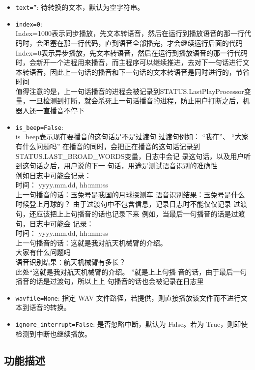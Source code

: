 \documentclass[]{article}
\begin{document}
	\begin{itemize}
		\item \texttt{text=''}: 待转换的文本，默认为空字符串。
		\item \texttt{index=0}:\\
		Index=1000表示同步播放，先文本转语音，然后在运行到播放语音的那一行代码时，会阻塞在那一行代码，直到语音全部播完，才会继续运行后面的代码\\
		Index=0表示异步播放，先文本转语音，然后在运行到播放语音的那一行代码时，会新开一个进程用来播音，而主程序可以继续推进，去对下一句话进行文本转语音，因此上一句话的播音和下一句话的文本转语音是同时进行的，节省时间\\
		值得注意的是，上一句话播音的进程会被记录到STATUS.LastPlayProcessor变量，一旦检测到打断，就会杀死上一句话播音的进程，防止用户打断之后，机器人还一直播音不停下
		\item \texttt{is\_beep=False}:\\is\_beep表示现在要播音的这句话是不是过渡句
		过渡句例如： “我在”、 “大家有什么问题吗”
		在播音的同时，会把正在播音的这句话记录到
		STATUS.LAST\_BROAD\_WORDS变量，日志中会记
		录这句话，以及用户听到这句话之后，用户说的下一
		句话，用途是测试语音识别的准确性\\
		例如日志中可能会记录：\\
		时间： yyyy.mm.dd, hh:mm:ss\\
		上一句播音的话：玉兔号是我国的月球探测车
		语音识别结果：玉兔号是什么时候登上月球的？
		由于过渡句中不包含信息，记录日志时不能仅仅记录
		过渡句，还应该把上上句播音的话也记录下来
		例如，当最后一句播音的话是过渡句，日志中可能会
		记录：\\
		时间： yyyy.mm.dd, hh:mm:ss\\
		上一句播音的话：这就是我对航天机械臂的介绍。\\
		大家有什么问题吗\\
		语音识别结果：航天机械臂有多长？\\
		此处“这就是我对航天机械臂的介绍。 ”就是上上句播
		音的话，由于最后一句播音的话是过渡句，所以上上
		句播音的话也会被记录在日志里
		\item \texttt{wavfile=None}: 指定 WAV 文件路径，若提供，则直接播放该文件而不进行文本到语音的转换。
		\item \texttt{ignore\_interrupt=False}: 是否忽略中断，默认为 False。若为 True，则即使检测到中断也继续播放。
	\end{itemize}
	
	\subsection{功能描述}
	
\end{document}
